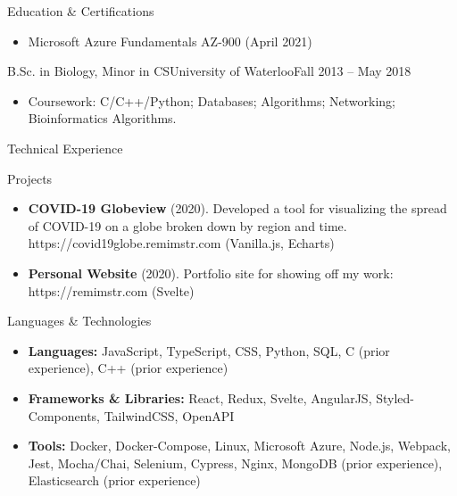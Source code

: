 \documentclass[]{mcdowellcv}
\begin{document}
	\begin{cvsection}{Education \& Certifications}
		\begin{cvsubsection}{}{}{}
			\begin{itemize}
				\item Microsoft Azure Fundamentals AZ-900 (April 2021)
			\end{itemize}
		\end{cvsubsection}
		\begin{cvsubsection}{B.Sc. in Biology, Minor in CS}{University of Waterloo}{Fall 2013 -- May 2018}
			\begin{itemize}
				\item Coursework: C/C++/Python; Databases; Algorithms; Networking; Bioinformatics Algorithms.
			\end{itemize}
		\end{cvsubsection}
	\end{cvsection}

	\begin{cvsection}{Technical Experience}
		\begin{cvsubsection}{Projects}{}{}
			\begin{itemize}
				\item \textbf{COVID-19 Globeview} (2020). Developed a tool for visualizing the spread of COVID-19 on a globe broken down by region and time.
					https://covid19globe.remimstr.com (Vanilla.js, Echarts)
				\item \textbf{Personal Website} (2020). Portfolio site for showing off my work: https://remimstr.com (Svelte)
			\end{itemize}
		\end{cvsubsection}
	\end{cvsection}

	\begin{cvsection}{Languages \& Technologies}
		\begin{cvsubsection}{}{}{}
			\begin{itemize}
				\item \textbf{Languages:} JavaScript, TypeScript, CSS, Python, SQL, C (prior experience), C++ (prior experience)
				\item \textbf{Frameworks \& Libraries:} React, Redux, Svelte, AngularJS, Styled-Components, TailwindCSS, OpenAPI
				\item \textbf{Tools:} Docker, Docker-Compose, Linux, Microsoft Azure, Node.js, Webpack, Jest, Mocha/Chai, Selenium, Cypress, Nginx, MongoDB (prior experience), Elasticsearch (prior experience)
			\end{itemize}
		\end{cvsubsection}
	\end{cvsection}
\end{document}
